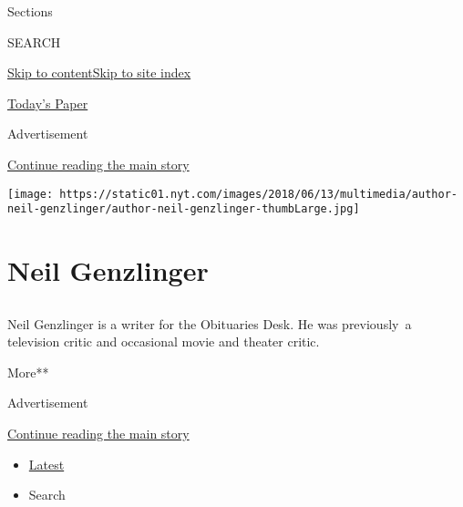 Sections

SEARCH

\protect\hyperlink{site-content}{Skip to
content}\protect\hyperlink{site-index}{Skip to site index}

\href{https://myaccount.nytimes.com/auth/login?response_type=cookie\&client_id=vi}{}

\href{https://www.nytimes.com/section/todayspaper}{Today's Paper}

Advertisement

\protect\hyperlink{after-top}{Continue reading the main story}

\texttt{[image: https://static01.nyt.com/images/2018/06/13/multimedia/author-neil-genzlinger/author-neil-genzlinger-thumbLarge.jpg]}

\hypertarget{neil-genzlinger}{%
\section{Neil Genzlinger}\label{neil-genzlinger}}

\subsection{}

Neil Genzlinger is a writer for the Obituaries Desk. He was previously~a
television critic and occasional movie and theater critic.

More**

Advertisement

\protect\hyperlink{after-mid1}{Continue reading the main story}

\begin{itemize}
\tightlist
\item
  \protect\hyperlink{stream-panel}{Latest}
\item
  Search
\end{itemize}

